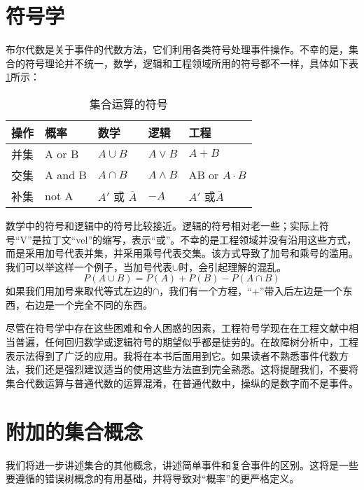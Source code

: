 \documentclass[cn,11pt,chinese]{elegantbook}
\begin{document}
 \section{符号学}
 
 布尔代数是关于事件的代数方法，它们利用各类符号处理事件操作。不幸的是，集合的符号理论并不统一，数学，逻辑和工程领域所用的符号都不一样，具体如下表\ref{tb:tb6-1}所示：
 
 \begin{table}[H]
 	\centering
 	\caption{集合运算的符号}
 	\label{tb:tb6-1}
 	\begin{tabular}{l l l l l}
 		\toprule
 		操作 & 概率      & 数学                                               & 逻辑  & 工程                                              \\ \midrule
 		并集 & A or B  & $A\cup B$                                              & $A\vee B$ & $A+B$                                             \\
 		交集 & A and B & $A\cap B$                                              & $A\wedge B$ & AB or $A \cdot B$                                       \\
 		补集 & not A     & $A'$ 或 $\overline{A}$ 					& $-A$  		& $A'$ 或$\overline{A}$ \\ \bottomrule
 	\end{tabular}
 \end{table}
 
 数学中的符号和逻辑中的符号比较接近。逻辑的符号相对老一些；实际上符号“V”是拉丁文“vel”的缩写，表示“或”。不幸的是工程领域并没有沿用这些方式，而是采用加号代表并集，并采用乘号代表交集。该方式导致了加号和乘号的滥用。我们可以举这样一个例子，当加号代表$\cup$时，会引起理解的混乱。
 $$
 P(A\cup B)=P(A)+P(B)-P(A\cap B)$$
 如果我们用加号来取代等式左边的$\cap$，我们有一个方程，“+”带入后左边是一个东西，右边是一个完全不同的东西。
 
 尽管在符号学中存在这些困难和令人困惑的因素，工程符号学现在在工程文献中相当普遍，任何回归数学或逻辑符号的期望似乎都是徒劳的。在故障树分析中，工程表示法得到了广泛的应用。我将在本书后面用到它。如果读者不熟悉事件代数方法，我们还是强烈建议适当的使用这些方法直到完全熟悉。这将提醒我们，不要将集合代数运算与普通代数的运算混淆，在普通代数中，操纵的是数字而不是事件。
 
 \section{附加的集合概念}
 我们将进一步讲述集合的其他概念，讲述简单事件和复合事件的区别。这将是一些要遵循的错误树概念的有用基础，并将导致对“概率”的更严格定义。
 
\end{document}
